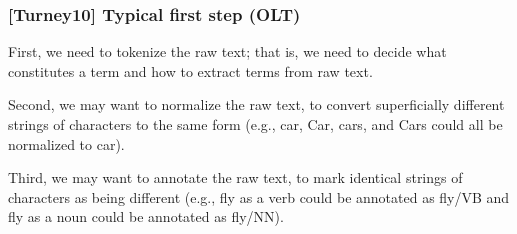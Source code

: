 	\begin{frame}[plain]
	 	\frametitle{[Turney10] Typical first step (OLT)}
		\begin{block}{}
      First, we need to tokenize the raw text; that is, we need to decide
      what constitutes a term and how to extract terms from raw text. 
		\end{block} 
		\begin{block}{}
      Second, we may want to normalize the raw text, to convert
      superficially different strings of characters to the same form (e.g.,
      car, Car, cars, and Cars could all be normalized to car).  
		\end{block} 
		\begin{block}{}
      Third, we may want to annotate the raw text, to mark identical
      strings of characters as being different (e.g., fly as a verb
      could be annotated as fly/VB and fly as a noun could be
      annotated as fly/NN). 
		\end{block} 
	\end{frame}
